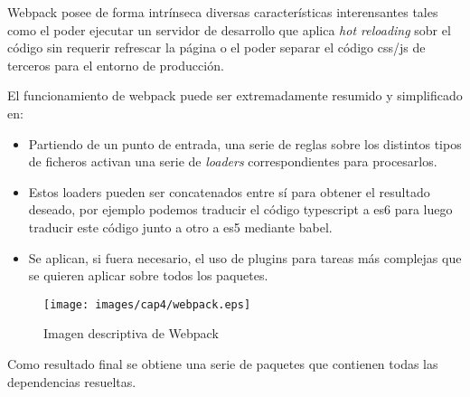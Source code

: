 \bigskip
Webpack posee de forma intrínseca diversas características interensantes tales como el 
poder ejecutar un servidor de desarrollo que aplica \textit{hot reloading} sobr el código 
sin requerir refrescar la página o el poder separar el código css/js de terceros para el 
entorno de producción. 

\bigskip 
El funcionamiento de webpack puede ser extremadamente resumido y simplificado en:

\begin{itemize}

\item Partiendo de un punto de entrada, una serie de reglas sobre los distintos tipos de ficheros
activan una serie de \textit{loaders} correspondientes para procesarlos. 

\item Estos loaders pueden ser concatenados entre sí para obtener el resultado deseado, por ejemplo
podemos traducir el código typescript a es6 para luego traducir este código junto a otro a es5 mediante
babel.

\item Se aplican, si fuera necesario, el uso de plugins para tareas más complejas que se quieren aplicar sobre
todos los paquetes.

\end{itemize}

\begin{figure}[!th]
\begin{center}
\texttt{[image: images/cap4/webpack.eps]}
\caption{Imagen descriptiva de Webpack}
\label{fig:Imagen descriptiva de Webpack}
\end{center}
\end{figure}


Como resultado final se obtiene una serie de paquetes que contienen todas las dependencias resueltas.